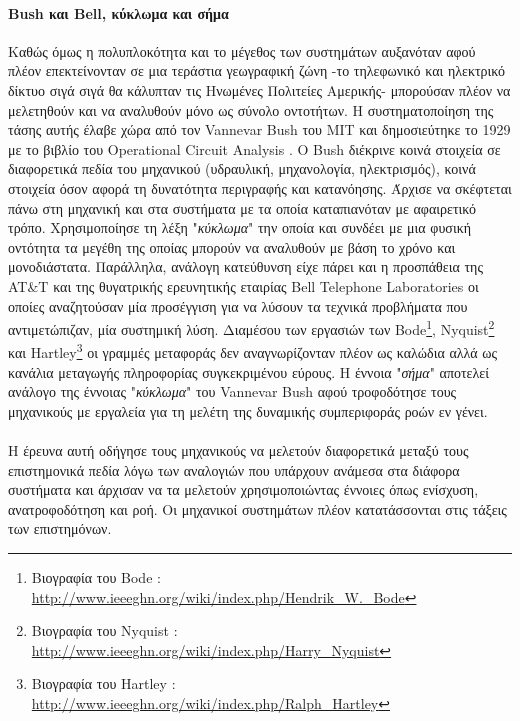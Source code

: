 \documentclass[a4paper,12pt,twoside]{report}
\begin{document}
{			\paragraph{Bush και Bell, κύκλωμα και σήμα}{Καθώς όμως η πολυπλοκότητα και το μέγεθος των συστημάτων αυξανόταν αφού πλέον επεκτείνονταν σε μια τεράστια γεωγραφική ζώνη -το τηλεφωνικό και ηλεκτρικό δίκτυο σιγά σιγά θα κάλυπταν τις Ηνωμένες Πολιτείες Αμερικής- μπορούσαν πλέον να μελετηθούν και να αναλυθούν μόνο ως σύνολο οντοτήτων. Η συστηματοποίηση της τάσης αυτής έλαβε χώρα από τον Vannevar Bush του \acrshort{MIT} και δημοσιεύτηκε το 1929 με το βιβλίο του Operational Circuit Analysis \cite{OperationalCircuitAnalysis:Bush1929}. Ο Bush διέκρινε κοινά στοιχεία σε διαφορετικά πεδία του μηχανικού (υδραυλική, μηχανολογία, ηλεκτρισμός), κοινά στοιχεία όσον αφορά τη δυνατότητα περιγραφής και κατανόησης. Άρχισε να σκέφτεται πάνω στη μηχανική και στα συστήματα με τα οποία καταπιανόταν με αφαιρετικό τρόπο. Χρησιμοποίησε τη λέξη "\textit{κύκλωμα}" την οποία και συνδέει με μια φυσική οντότητα τα μεγέθη της οποίας μπορούν να αναλυθούν με βάση το χρόνο και μονοδιάστατα. Παράλληλα, ανάλογη κατεύθυνση είχε πάρει και η προσπάθεια της AT{\&}T και της θυγατρικής ερευνητικής εταιρίας Bell Telephone Laboratories οι οποίες αναζητούσαν μία προσέγγιση για να λύσουν τα τεχνικά προβλήματα που αντιμετώπιζαν, μία συστημική λύση. Διαμέσου των εργασιών των Bode\footnote{Βιογραφία του Bode : \url{http://www.ieeeghn.org/wiki/index.php/Hendrik_W._Bode}}, Nyquist\footnote{Βιογραφία του Nyquist : \url{http://www.ieeeghn.org/wiki/index.php/Harry_Nyquist}} και Hartley\footnote{Βιογραφία του Hartley : \url{http://www.ieeeghn.org/wiki/index.php/Ralph_Hartley}} οι γραμμές μεταφοράς δεν αναγνωρίζονταν πλέον ως καλώδια αλλά ως κανάλια μεταγωγής πληροφορίας συγκεκριμένου εύρους. Η έννοια "\textit{σήμα}" αποτελεί ανάλογο της έννοιας "\textit{κύκλωμα}" του Vannevar Bush αφού τροφοδότησε τους μηχανικούς με εργαλεία για τη μελέτη της δυναμικής συμπεριφοράς ροών εν γένει.
			}
			\paragraph{}{Η έρευνα αυτή οδήγησε τους μηχανικούς να μελετούν διαφορετικά μεταξύ τους επιστημονικά πεδία λόγω των αναλογιών που υπάρχουν ανάμεσα στα διάφορα συστήματα και άρχισαν να τα μελετούν χρησιμοποιώντας έννοιες όπως ενίσχυση, ανατροφοδότηση και ροή. Οι μηχανικοί συστημάτων πλέον κατατάσσονται στις τάξεις των επιστημόνων.
			}
			
}
\end{document}
